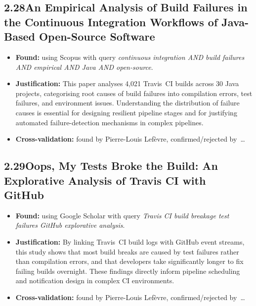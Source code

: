 \documentclass[a4paper,11pt]{article}
\begin{document}
\subsection*{2.28\quad An Empirical Analysis of Build Failures in the Continuous Integration Workflows of Java-Based Open-Source Software~\cite{rausch2017empirical}}

\begin{itemize}[leftmargin=1.5em]
  \item \textbf{Found:} using Scopus with query \textit{continuous integration AND build failures AND empirical AND Java AND open-source}.
  \item \textbf{Justification:} This paper analyses 4,021 Travis~CI builds across 30 Java projects, categorising root causes of build failures into compilation errors, test failures, and environment issues. Understanding the distribution of failure causes is essential for designing resilient pipeline stages and for justifying automated failure-detection mechanisms in complex pipelines.
  \item \textbf{Cross-validation:} found by Pierre-Louis Lef\`evre, confirmed/rejected by~\ldots
\end{itemize}

\subsection*{2.29\quad Oops, My Tests Broke the Build: An Explorative Analysis of Travis CI with GitHub~\cite{beller2017oops}}

\begin{itemize}[leftmargin=1.5em]
  \item \textbf{Found:} using Google Scholar with query \textit{Travis CI build breakage test failures GitHub explorative analysis}.
  \item \textbf{Justification:} By linking Travis~CI build logs with GitHub event streams, this study shows that most build breaks are caused by test failures rather than compilation errors, and that developers take significantly longer to fix failing builds overnight. These findings directly inform pipeline scheduling and notification design in complex CI environments.
  \item \textbf{Cross-validation:} found by Pierre-Louis Lef\`evre, confirmed/rejected by~\ldots
\end{itemize}
\end{document}
